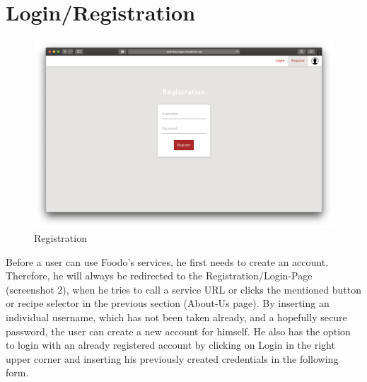 \section*{Login/Registration}
\vspace{-2em}
\begin{figure}[H]
	\captionsetup{justification=centering}
	\begin{center}
		\includegraphics[scale=0.28]{Ressourcen/img/screenshots/screenshotD.png}
		\vspace{-3em}
		\caption{Registration}
	\end{center}
\end{figure}
Before a user can use Foodo’s services, he first needs to create an account. Therefore, he will always be redirected to the Registration/Login-Page (screenshot 2), when he tries to call a service URL or clicks the mentioned button or recipe selector in the previous section (About-Us page). By inserting an individual username, which has not been taken already, and a hopefully secure password, the user can create a new account for himself. He also has the option to login with an already registered account by clicking on Login in the right upper corner and inserting his previously created credentials in the following form.
